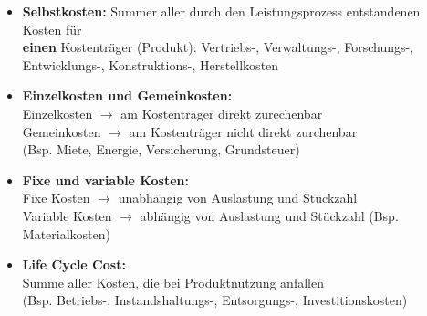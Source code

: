 \begin{scriptsize}
    \begin{itemize}
        \item \textbf{Selbstkosten:} Summer aller durch den Leistungsprozess entstandenen Kosten für \\\textbf{einen} Kostenträger (Produkt): Vertriebs-, Verwaltungs-, Forschungs-, \\Entwicklungs-, Konstruktions-, Herstellkosten
        \item \textbf{Einzelkosten und Gemeinkosten:} 
        \\Einzelkosten $\to$ am Kostenträger direkt  zurechenbar
        \\Gemeinkosten $\to$ am Kostenträger nicht direkt zurchenbar \\(Bsp. Miete, Energie, Versicherung, Grundsteuer)
        \item \textbf{Fixe und variable Kosten:} 
        \\Fixe Kosten $\to$ unabhängig von Auslastung und Stückzahl
        \\Variable Kosten $\to$ abhängig von Auslastung und Stückzahl (Bsp. Materialkosten)
        \item \textbf{Life Cycle Cost:}
        \\ Summe aller Kosten, die bei Produktnutzung anfallen \\(Bsp. Betriebs-, Instandshaltungs-, Entsorgungs-, Investitionskosten)
    \end{itemize}
\end{scriptsize}
